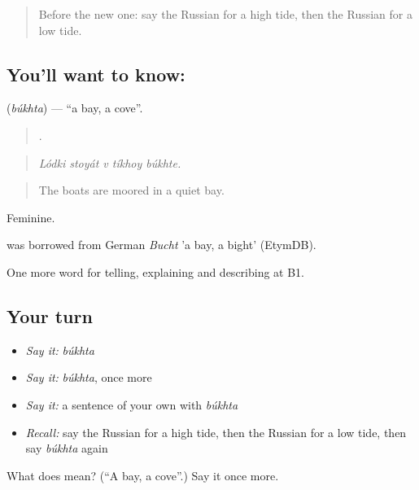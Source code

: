 \label{lesson:RU-C463-bukhta}



\begin{quote}
Before the new one: say the Russian for a high tide, then the Russian for a low tide.
\end{quote}

\subsection*{You'll want to know: }
\textbf{} (\emph{búkhta}) — \textquotedblleft{}a bay, a cove\textquotedblright{}.

\begin{quote}
    .
\end{quote}

\begin{quote}
\emph{Lódki stoyát v tíkhoy búkhte.}
\end{quote}

\begin{quote}
The boats are moored in a quiet bay.
\end{quote}

Feminine.

\begin{cousinweb}
\emph{} was borrowed from German \emph{Bucht} 'a bay, a bight' (EtymDB).
\end{cousinweb}

\begin{grammarlens}[title={What you've built}]
One more word for telling, explaining and describing at B1.
\end{grammarlens}

\subsection*{Your turn}
\begin{itemize}
\raggedright
  \item \emph{Say it:} \emph{búkhta}
  \item \emph{Say it:} \emph{búkhta}, once more
  \item \emph{Say it:} a sentence of your own with \emph{búkhta}
  \item \emph{Recall:} say the Russian for a high tide, then the Russian for a low tide, then say \emph{búkhta} again
\end{itemize}

\begin{tcolorbox}[breakable,colback=teal!4,colframe=teal!35!black,title={Before you move on}]
What does  mean? (\textquotedblleft{}A bay, a cove\textquotedblright{}.) Say it once more.
\end{tcolorbox}
